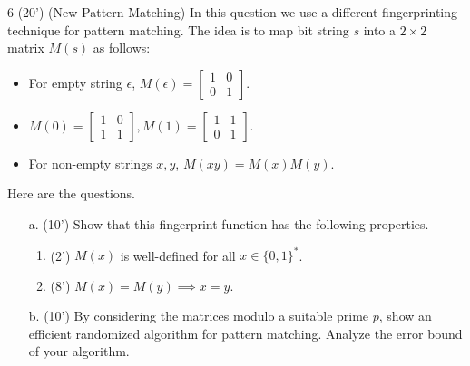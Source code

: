     \begin{question}{6 (20') (New Pattern Matching)}
		In this question we use a different fingerprinting technique for pattern matching. The idea is to map bit string $s$ into a $2\times2$ matrix $M(s)$ as follows:
		\begin{itemize}
			\item For empty string $\epsilon$, $M(\epsilon)=\begin{bmatrix}1&0\\0&1\end{bmatrix}$.
			\item $M(0)=\begin{bmatrix}1&0\\1&1\end{bmatrix},M(1)=\begin{bmatrix}1&1\\0&1\end{bmatrix}.$
			\item For non-empty strings $x,y$, $M(xy)=M(x)M(y).$
		\end{itemize}
		
		Here are the questions. 
		\begin{itemize}
			\item[a. (10')] Show that this fingerprint function has the following properties.
			\begin{enumerate}
				\item (2') $M(x)$ is well-defined for all $x\in\{0,1\}^*$.
				\item (8') $M(x)=M(y)\implies x=y$.
			\end{enumerate}
			\item[b. (10')] By considering the matrices modulo a suitable prime $p$, show an efficient randomized algorithm for pattern matching. Analyze the error bound of your algorithm.
		\end{itemize}
	\end{question}